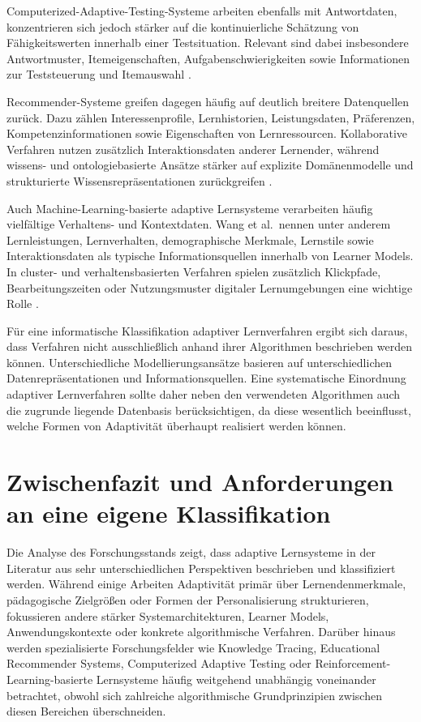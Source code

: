 Computerized-Adaptive-Testing-Systeme arbeiten ebenfalls mit
Antwortdaten, konzentrieren sich jedoch stärker auf die kontinuierliche
Schätzung von Fähigkeitswerten innerhalb einer Testsituation. Relevant
sind dabei insbesondere Antwortmuster, Itemeigenschaften,
Aufgabenschwierigkeiten sowie Informationen zur Teststeuerung und
Itemauswahl \citep{Han2018, Liu2024}.

Recommender-Systeme greifen dagegen häufig auf deutlich breitere
Datenquellen zurück. Dazu zählen Interessenprofile, Lernhistorien,
Leistungsdaten, Präferenzen, Kompetenzinformationen sowie Eigenschaften
von Lernressourcen. Kollaborative Verfahren nutzen zusätzlich
Interaktionsdaten anderer Lernender, während wissens- und
ontologiebasierte Ansätze stärker auf explizite Domänenmodelle und
strukturierte Wissensrepräsentationen zurückgreifen
\citep{daSilva2023, George2019}.

Auch Machine-Learning-basierte adaptive Lernsysteme verarbeiten häufig
vielfältige Verhaltens- und Kontextdaten. Wang et al.~nennen unter
anderem Lernleistungen, Lernverhalten, demographische Merkmale,
Lernstile sowie Interaktionsdaten als typische Informationsquellen
innerhalb von Learner Models. In cluster- und verhaltensbasierten
Verfahren spielen zusätzlich Klickpfade, Bearbeitungszeiten oder
Nutzungsmuster digitaler Lernumgebungen eine wichtige Rolle
\citep{Wang2025}.

Für eine informatische Klassifikation adaptiver Lernverfahren ergibt
sich daraus, dass Verfahren nicht ausschließlich anhand ihrer
Algorithmen beschrieben werden können. Unterschiedliche
Modellierungsansätze basieren auf unterschiedlichen
Datenrepräsentationen und Informationsquellen. Eine systematische
Einordnung adaptiver Lernverfahren sollte daher neben den verwendeten
Algorithmen auch die zugrunde liegende Datenbasis berücksichtigen, da
diese wesentlich beeinflusst, welche Formen von Adaptivität überhaupt
realisiert werden können.

\section{Zwischenfazit und Anforderungen an eine eigene
Klassifikation}\label{zwischenfazit-und-anforderungen-an-eine-eigene-klassifikation}

Die Analyse des Forschungsstands zeigt, dass adaptive Lernsysteme in der
Literatur aus sehr unterschiedlichen Perspektiven beschrieben und
klassifiziert werden. Während einige Arbeiten Adaptivität primär über
Lernendenmerkmale, pädagogische Zielgrößen oder Formen der
Personalisierung strukturieren, fokussieren andere stärker
Systemarchitekturen, Learner Models, Anwendungskontexte oder konkrete
algorithmische Verfahren. Darüber hinaus werden spezialisierte
Forschungsfelder wie Knowledge Tracing, Educational Recommender Systems,
Computerized Adaptive Testing oder Reinforcement-Learning-basierte
Lernsysteme häufig weitgehend unabhängig voneinander betrachtet, obwohl
sich zahlreiche algorithmische Grundprinzipien zwischen diesen Bereichen
überschneiden.

